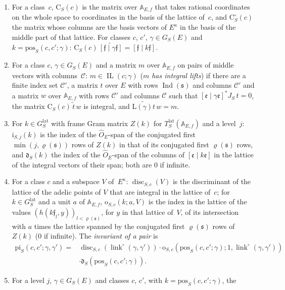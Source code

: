\documentclass[11pt,a4paper]{article}
\newcommand{\Q}{\mathbb{Q}}
\newcommand{\m}[1]{\mbox{$#1$}}        %
\theoremstyle{plainx}
\theoremstyle{uprightx}
\newcommand{\fs}{\mathfrak{s}}                      %
\newcommand{\AEf}{\mathbb{A}_{E,f}}
\newcommand{\hO}{\hat{O}_E}
\newcommand{\GL}{\mathrm{GL}}
\newcommand{\rh}[1]{\varrho(#1)}                    %
\newcommand{\Ix}[1]{\operatorname{Ind}(#1)}                          %
\newcommand{\Tlat}[2]{T^{\mathrm{lat}}_{#1}(#2)}    %
\newcommand{\GS}[2]{G_{#1}(#2)}                     %
\newcommand{\GFin}[1]{G^{\mathrm{lat}}_{#1}}        %
\newcommand{\pos}[4]{\mathrm{pos}_{#1}(#2,#3;#4)}   %
\newcommand{\clink}[2]{\operatorname{link}^{\circ}(#1,#2)} %
\newcommand{\pinv}[5]{\mathrm{pi}_{#1}(#2,#3;#4,#5)} %
\newcommand{\ldsq}[3]{\mathrm{ld}_{#1}(#2,#3)}      %
\newcommand{\lmet}[1]{Q^{\mathrm{link}}_{#1}}       %
\newcommand{\Jrat}[1]{J_{#1}}                         %
\newcommand{\fpair}[1]{[\mathfrak{f}\mid #1\mathfrak{f}]}   %
\newcommand{\ifp}[1]{[\mathfrak{e}\mid #1\mathfrak{e}]}     %
\newcommand{\lmat}[1]{\mathrm{L}(#1)}                 %
\newcommand{\cc}[2]{\mathrm{C}_{#1}(#2)}              %
\newcommand{\ccX}[2]{\mathrm{C}^{\circ}_{#1}(#2)}     %
\newcommand{\lifts}[4]{#4\in\operatorname{IL}(#2;#3)} %
\newcommand{\xri}[3]{\mathrm{i}_{#1,#2}(#3)}          %
\newcommand{\sat}[2]{\mathfrak{d}_{#1}(#2)}           %
\newcommand{\ldisc}[3]{\operatorname{disc}_{#1,#2}(#3)} %
\newcommand{\fvi}[5]{\mathrm{o}_{#1,#2}(#3;#4,#5)}    %
\begin{document}
\begin{enumerate}[label=\textup{(\alph*)},leftmargin=2.3em,itemsep=2pt]
\m{e\in\GL_{\mathcal C}(\AEf)}: \m{\ldsq{S}{v}{e}=|N_{E/\Q}\det(v^*\lmet{S}v)|\cdot[\det e]^2}.
\item For a class~$c$, \m{\cc{S}{c}} is the matrix over \m{\AEf} that takes rational coordinates on the whole
space to coordinates in the basis of the lattice of~$c$, and \m{\ccX{S}{c}} the matrix whose columns are the
basis vectors of $E^\kappa$ in the basis of the middle part of that lattice. For classes $c$, $c'$,
\m{\gamma\in\GS{S}{E}} and \m{k=\pos{S}{c}{c'}{\gamma}}: \m{\cc{S}{c}\,\widetilde{\fpair{\gamma}}=\fpair{k}}.
\item For a class $c$, \m{\gamma\in\GS{S}{E}} and a matrix $m$ over \m{\AEf} on pairs of middle vectors with
columns~$\mathcal C$: \m{\lifts{S}{c}{\gamma}{m}} (\emph{$m$ has integral lifts}) if there are a finite index set
$\mathcal C'$, a matrix $t$ over $E$ with rows \m{\Ix{\fs}} and columns $\mathcal C'$ and a matrix $w$ over
\m{\AEf} with rows $\mathcal C'$ and columns $\mathcal C$ such that \m{\ifp{\gamma}^*\Jrat{S}\,t=0}, the matrix
\m{\cc{S}{c}\,\tilde t\,w} is integral, and \m{\widetilde{\lmat{\gamma}t}\,w=m}.
\item For \m{k\in\GFin{S}} with frame Gram matrix $Z(k)$ for \m{\Tlat{S}{\AEf}} and a level~$j$:
\m{\xri{S}{j}{k}} is the index of the \m{\hO}-span of the conjugated first \m{\min(j,\rh{\fs})} rows of $Z(k)$ in
that of its conjugated first \m{\rh{\fs}} rows, and \m{\sat{S}{k}} the index of the \m{\hO}-span of the columns of
\m{\ifp{k}} in the lattice of the integral vectors of their span; both are $0$ if infinite.
\item For a class $c$ and a subspace $V$ of~$E^\kappa$: \m{\ldisc{S}{c}{V}} is the discriminant of the lattice of
the adelic points of $V$ that are integral in the lattice of~$c$; for \m{k\in\GFin{S}} and a unit $a$ of
\m{\AEf}, \m{\fvi{S}{c}{k}{a}{V}} is the index in the lattice of the values \m{(h(k\mathfrak f_l,y))_{l<\rh{\fs}}}, for $y$
in that lattice of~$V$, of its intersection with $a$ times the lattice spanned by the conjugated first
\m{\rh{\fs}} rows of $Z(k)$ ($0$ if infinite). The \emph{invariant of a pair} is
\[\begin{aligned}\pinv{S}{c}{c'}{\gamma}{\gamma'}={}&\ldisc{S}{c}{\clink{\gamma}{\gamma'}}\cdot
\fvi{S}{c}{\pos{S}{c}{c'}{\gamma}}{1}{\clink{\gamma}{\gamma'}}\\&\cdot\sat{S}{\pos{S}{c}{c'}{\gamma}} .\end{aligned}\]
\item For a level $j$, \m{\gamma\in\GS{S}{E}} and classes $c$, $c'$, with \m{k=\pos{S}{c}{c'}{\gamma}}, the

\end{enumerate}
\end{document}

